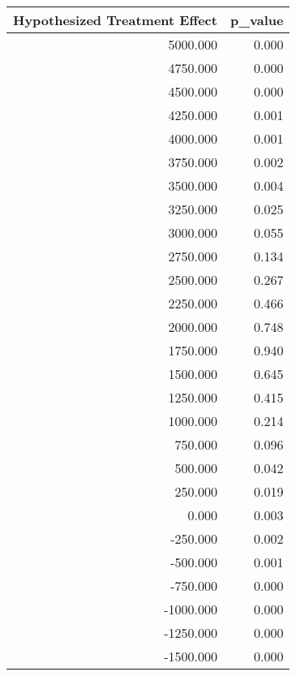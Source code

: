 \begin{tabular}{rr}
  \hline
Hypothesized Treatment Effect & p\_value \\ 
  \hline
5000.000 & 0.000 \\ 
  4750.000 & 0.000 \\ 
  4500.000 & 0.000 \\ 
  4250.000 & 0.001 \\ 
  4000.000 & 0.001 \\ 
  3750.000 & 0.002 \\ 
  3500.000 & 0.004 \\ 
  3250.000 & 0.025 \\ 
  3000.000 & 0.055 \\ 
  2750.000 & 0.134 \\ 
  2500.000 & 0.267 \\ 
  2250.000 & 0.466 \\ 
  2000.000 & 0.748 \\ 
  1750.000 & 0.940 \\ 
  1500.000 & 0.645 \\ 
  1250.000 & 0.415 \\ 
  1000.000 & 0.214 \\ 
  750.000 & 0.096 \\ 
  500.000 & 0.042 \\ 
  250.000 & 0.019 \\ 
  0.000 & 0.003 \\ 
  -250.000 & 0.002 \\ 
  -500.000 & 0.001 \\ 
  -750.000 & 0.000 \\ 
  -1000.000 & 0.000 \\ 
  -1250.000 & 0.000 \\ 
  -1500.000 & 0.000 \\ 
   \hline
\end{tabular}
